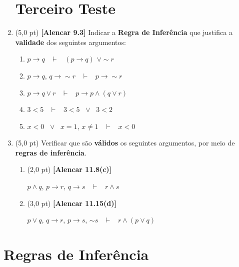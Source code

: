 \documentclass[12pt,a4paper,oneside]{article}
\begin{document}
\begin{enumerate}
	
	\section*{Terceiro Teste}
	
	\item (5,0 pt) {\bf [Alencar 9.3]} Indicar a {\bf Regra de Inferência} que justifica a {\bf validade} dos seguintes argumentos:
	\begin{enumerate}
		\item $p \rightarrow q$ \ $\vdash$ \ $(p \rightarrow q)$ $\vee \sim r$
		\item $p \rightarrow q$, $q \rightarrow \sim r$ \ $\vdash$ \ $p \rightarrow \sim r$
		\item $p \rightarrow q \vee r$ \ $\vdash$ \ $p \rightarrow p \wedge (q \vee r)$
		\item $3 <5$ \ $\vdash$ \ $3<5$ \ $\vee$ \ $3<2$
		\item $x < 0$ \ $\vee$ \ $x=1$, $x \not=1$ \ $\vdash$ \ $x <0$
	\end{enumerate}
	
	\item (5,0 pt) Verificar que são {\bf válidos} os seguintes argumentos, por meio de {\bf regras de inferência}.
	\begin{enumerate}
		\item (2,0 pt) {\bf [Alencar 11.8(c)]}
		\begin{center}
			$p \wedge q$, $p \rightarrow r$, $q \rightarrow s$ \ $\vdash$ \ $r \wedge s$
		\end{center}
		
		
		\item (3,0 pt) {\bf [Alencar 11.15(d)]} 
		\begin{center}
			$p \vee q$, $q \rightarrow r$, $p \rightarrow s$, $\sim s$ 
			\ $\vdash$ \ $r \wedge (p \vee q)$
		\end{center}
		
	\end{enumerate}

\end{enumerate}

\newpage

\section*{Regras de Inferência}
\end{document}
